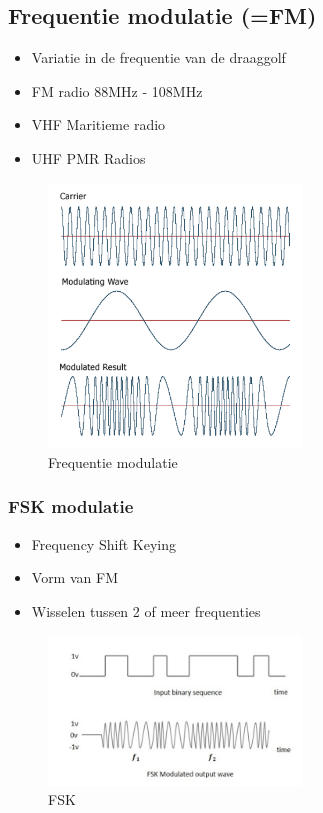 \documentclass{article}
\begin{document}
\subsection{Frequentie modulatie (=FM)}
\begin{itemize}
    \item Variatie in de frequentie van de draaggolf
    \item FM radio 88MHz - 108MHz
    \item VHF Maritieme radio
    \item UHF PMR Radios
\end{itemize}

\begin{figure}[H]
    \centering
    \includegraphics[width=0.6\textwidth]{Screenshot_20200302_121335.png}
    \caption{Frequentie modulatie}
\end{figure}

\subsubsection{FSK modulatie}
\begin{itemize}
    \item Frequency Shift Keying
    \item Vorm van FM
    \item Wisselen tussen 2 of meer frequenties
\end{itemize}

\begin{figure}[H]
    \centering
    \includegraphics[width=0.6\textwidth]{Screenshot_20200302_121458.png}
    \caption{FSK}
\end{figure}
\end{document}
